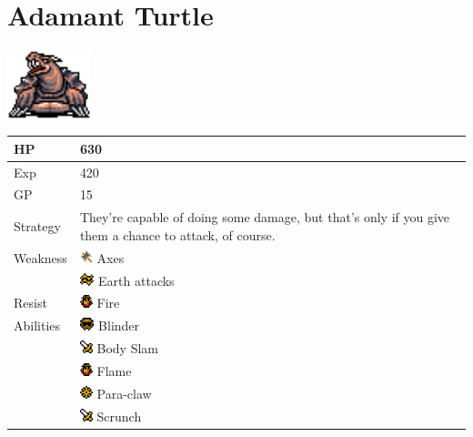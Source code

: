 \section{Adamant Turtle}
\label{monster:adamant_turtle}

\includegraphics[height=2cm,keepaspectratio]{./resources/monster/adamant_turtle}

\begin{longtable}{ l p{9cm} }
	HP
	& 630
\\ \hline
	Exp
	& 420
\\ \hline
	GP
	& 15
\\ \hline
	Strategy
	& They're capable of doing some damage, but that's only if you give them a chance to attack, of course.
\\ \hline
	Weakness
	& \includegraphics[height=1em,keepaspectratio]{./resources/effects/axe} Axes \\
	& \includegraphics[height=1em,keepaspectratio]{./resources/effects/earth} Earth attacks
\\ \hline
	Resist
	& \includegraphics[height=1em,keepaspectratio]{./resources/effects/fire} Fire
\\ \hline
	Abilities
	& \includegraphics[height=1em,keepaspectratio]{./resources/effects/blind} Blinder \\
	& \includegraphics[height=1em,keepaspectratio]{./resources/effects/damage} Body Slam \\
	& \includegraphics[height=1em,keepaspectratio]{./resources/effects/fire} Flame \\
	& \includegraphics[height=1em,keepaspectratio]{./resources/effects/paralyze} Para-claw \\
	& \includegraphics[height=1em,keepaspectratio]{./resources/effects/damage} Scrunch
\end{longtable}
